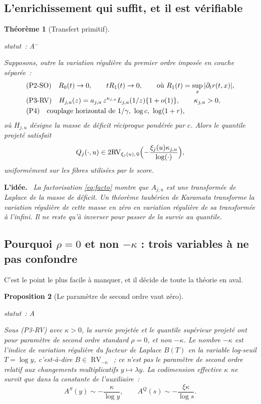 \documentclass[11pt]{article}
\theoremstyle{plain}
\newtheorem{theoreme}{Théorème}[section]
\newtheorem{proposition}[theoreme]{Proposition}
\theoremstyle{definition}
\theoremstyle{remark}
\DeclareMathOperator{\RV}{RV}
\newcommand{\1}{\mathbf 1}
\newcommand{\statut}[1]{%
  \nopagebreak\par\nopagebreak
  \hfill{\normalfont\footnotesize\textcolor{gris}{statut~: #1}}%
  \par\nopagebreak\vspace{-2pt}}
\newenvironment{idee}
  {\par\medskip\noindent\textcolor{bleu}{\textbf{L'idée.}}\ \itshape}
  {\par\medskip}
\begin{document}
\subsection{L'enrichissement qui suffit, et il est vérifiable}

\begin{theoreme}[Transfert primitif]
\label{thm:transfert}
\statut{A$^-$}
Supposons, outre la variation régulière du premier ordre imposée en
couche séparée~:
\begin{align}
 &\text{(P2-SO)}\quad R_0(t)\to0,\qquad tR_1(t)\to0,
   \qquad\text{où } R_1(t)=\sup_x|\partial_tr(t,x)|,\notag\\
 &\text{(P3-RV)}\quad H_{j,u}(z)=a_{j,u}\,z^{\kappa_{j,u}}L_{j,u}(1/z)\{1+o(1)\},
   \qquad \kappa_{j,u}>0,\notag\\
 &\text{(P4)}\quad \text{couplage horizontal de } 1/\gamma,\ \log c,\ \log(1+r),\notag
\end{align}
où $H_{j,u}$ désigne la masse de déficit réciproque pondérée par $c$.
Alors le quantile projeté satisfait
\[
 Q_j(\cdot,u)\in2\mathrm{RV}_{\xi_j(u),\,0}
 \Bigl(-\frac{\xi_j(u)\kappa_{j,u}}{\log(\cdot)}\Bigr),
\]
uniformément sur les fibres utilisées par le score.
\end{theoreme}

\begin{idee}
La factorisation \eqref{eq:facto} montre que $A_{j,u}$ est une
transformée de Laplace de la masse de déficit. Un théorème taubérien de
Karamata transforme la variation régulière de cette masse \emph{en zéro}
en variation régulière de sa transformée \emph{à l'infini}. Il ne reste
qu'à inverser pour passer de la survie au quantile.
\end{idee}

\subsection{Pourquoi \texorpdfstring{$\rho=0$}{rho=0} et non \texorpdfstring{$-\kappa$}{-kappa} : trois variables à ne pas confondre}

C'est le point le plus facile à manquer, et il décide de toute la théorie
en aval.

\begin{proposition}[Le paramètre de second ordre vaut zéro]
\label{prop:rho0}
\statut{A}
Sous (P3-RV) avec $\kappa>0$, la survie projetée et le quantile supérieur
projeté ont pour paramètre de second ordre standard $\rho=0$, et non
$-\kappa$. Le nombre $-\kappa$ est l'indice de variation régulière du
facteur de Laplace $B(T)$ \emph{en la variable log-seuil} $T=\log y$,
c'est-à-dire $B\in\RV_{-\kappa}$~; ce n'est pas le paramètre de second
ordre relatif aux changements \emph{multiplicatifs} $y\mapsto\lambda y$.
La codimension effective $\kappa$ ne survit que dans la constante de
l'auxiliaire~:
\[
 A^S(y)\sim-\frac{\kappa}{\log y},
 \qquad
 A^Q(s)\sim-\frac{\xi\kappa}{\log s}.
\]
\end{proposition}
\end{document}
